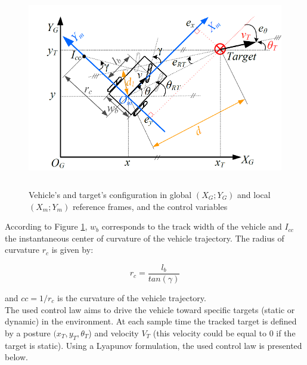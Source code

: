 	\begin{figure}[!h]
	\begin{center}
		
		\includegraphics[width=120mm,height=80mm]{chapters/Chapitre_4/Figures/vehicle_tricycle model.PNG}\\
		\caption{	\label{fig:vehicle_tricycle_model}Vehicle’s and target’s configuration in global $(X_G; Y_G)$ and local $(X_m; Y_m)$ reference
frames, and the control variables \cite{ventura2015safe}}
		
		
		
	\end{center}
\end{figure}



According to Figure \ref{fig:vehicle_tricycle_model}, $w_b$ corresponds to the track width of the vehicle and $I_{cc}$ the instantaneous center of curvature of the vehicle trajectory. The radius of curvature $r_c$ is given by: 

\begin{equation}
    r_c=\frac{l_b}{tan(\gamma)}
\end{equation}

\noindent and $cc=1/r_c$ is the curvature of the vehicle trajectory. \\




The used control law \cite{vilca2015novel} aims to drive the vehicle toward specific targets (static or dynamic) in the environment. At each sample time the tracked target is defined by a posture $(x_T,y_T,\theta_T$) and velocity ${V}_T$ (this velocity could be equal to 0 if the target is static). Using a Lyapunov formulation, the used control law \cite{vilca2015novel} is presented below. 

